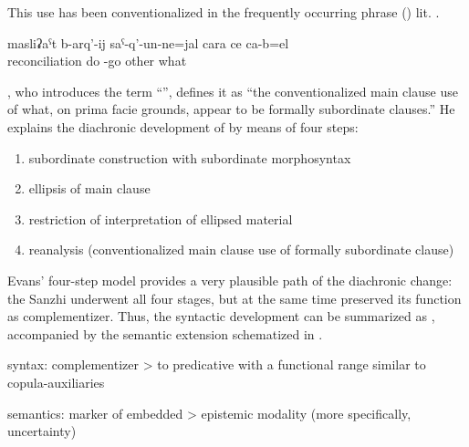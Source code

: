 This use has been conventionalized in the frequently occurring phrase  ()  lit.  .
%
\begin{exe}
	\ex	\label{ex:He came out to reconcile them or so or there is something else}
	\gll	masliʡaˁt	b-arq'-ij	saˁ-q'-un-ne=jal	cara	ce	ca-b=el\\
		reconciliation	do	-go	other	what	\\
	\glt	{}
\end{exe}

\citet[367]{Evans2007}, who introduces the term ``'', defines it as ``the conventionalized main clause use of what, on prima facie grounds, appear to be formally subordinate clauses.'' He explains the diachronic development of  by means of four steps:
\begin{enumerate}
\item subordinate construction with subordinate morphosyntax
\item ellipsis of main clause
\item restriction of interpretation of ellipsed material
\item reanalysis (conventionalized main clause use of formally subordinate clause)
\end{enumerate}
Evans' four-step model provides a very plausible path of the diachronic change: the Sanzhi  underwent all four stages, but at the same time preserved its function as complementizer. Thus, the syntactic development can be summarized as , accompanied by the semantic extension schematized in .

\begin{exe}
	\ex	 \label{ex:complementizer}
		syntax: complementizer > to predicative  with a functional range similar to copula-auxiliaries 
\end{exe}

\begin{exe}
	\ex	 \label{ex:complementizer2}
	semantics: marker of embedded  > epistemic modality (more specifically, uncertainty)
\end{exe}

